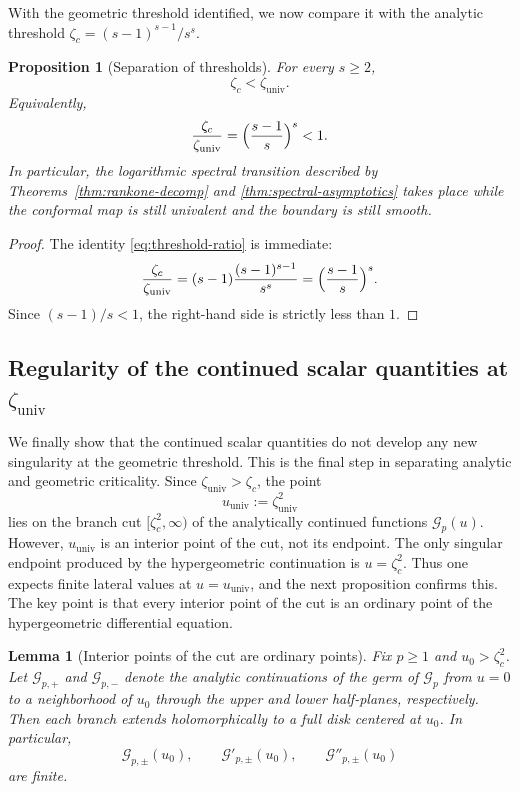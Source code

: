 \documentclass[11pt]{amsart}
\numberwithin{equation}{section}
\theoremstyle{plain}
\newtheorem{proposition}[theorem]{Proposition}
\newtheorem{lemma}[theorem]{Lemma}
\theoremstyle{definition}
\theoremstyle{remark}
\begin{document}
With the geometric threshold identified, we now compare it with the analytic
threshold $\zeta_c = (s-1)^{s-1}/s^s$.

\begin{proposition}[Separation of thresholds]
	\label{prop:separation}
	For every \(s\ge2\),
	\[
		\zeta_c<\zeta_{\mathrm{univ}}.
	\]
	Equivalently,
	\begin{equation}\label{eq:threshold-ratio}
		\frac{\zeta_c}{\zeta_{\mathrm{univ}}}
		=
		\Bigl(\frac{s-1}{s}\Bigr)^s
		<1.
	\end{equation}
	In particular, the logarithmic spectral transition described by
	Theorems~\ref{thm:rankone-decomp} and
	\ref{thm:spectral-asymptotics} takes place while the conformal map is still
	univalent and the boundary is still smooth.
\end{proposition}

\begin{proof}
	The identity \eqref{eq:threshold-ratio} is immediate:
	\[
		\frac{\zeta_c}{\zeta_{\mathrm{univ}}}
		=
		(s-1)\frac{(s-1)^{s-1}}{s^s}
		=
		\Bigl(\frac{s-1}{s}\Bigr)^s.
	\]
	Since \((s-1)/s<1\), the right-hand side is strictly less than \(1\).
\end{proof}

\subsection{\texorpdfstring{Regularity of the continued scalar quantities at $\zeta_{\mathrm{univ}}$}{Regularity of the continued scalar data at zeta-univ}}
\label{subsec:univ-spectral}

We finally show that the continued scalar quantities do not develop any new
singularity at the geometric threshold. This is the final step in separating
analytic and geometric criticality. Since \(\zeta_{\mathrm{univ}}>\zeta_c\), the point
\[
	u_{\mathrm{univ}}:=\zeta_{\mathrm{univ}}^2
\]
lies on the branch cut \([\zeta_c^2,\infty)\) of the analytically continued
functions \(\mathcal G_p(u)\). However, \(u_{\mathrm{univ}}\) is an interior
point of the cut, not its endpoint. The only singular endpoint produced by
the hypergeometric continuation is \(u=\zeta_c^2\). Thus one expects finite
lateral values at \(u=u_{\mathrm{univ}}\), and the next proposition confirms
this. The key point is that every interior point of the cut is an ordinary
point of the hypergeometric differential equation.

\begin{lemma}[Interior points of the cut are ordinary points]
	\label{lem:interior-cut-ordinary}
	Fix \(p\ge1\) and \(u_0>\zeta_c^2\). Let \(\mathcal G_{p,+}\) and
	\(\mathcal G_{p,-}\) denote the analytic continuations of the germ of
	\(\mathcal G_p\) from \(u=0\) to a neighborhood of \(u_0\) through the upper
	and lower half-planes, respectively. Then each branch extends holomorphically
	to a full disk centered at \(u_0\). In particular,
	\[
		\mathcal G_{p,\pm}(u_0),\qquad
		\mathcal G'_{p,\pm}(u_0),\qquad
		\mathcal G''_{p,\pm}(u_0)
	\]
	are finite.
\end{lemma}
\end{document}
